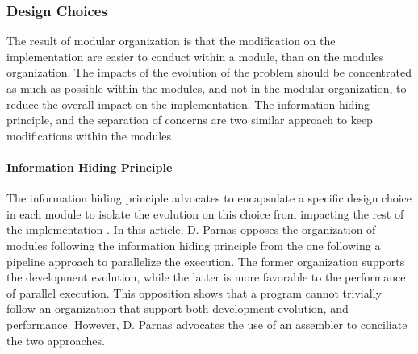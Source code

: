 

\subsubsection{Design Choices}

The result of modular organization is that the modification on the implementation are easier to conduct within a module, than on the modules organization.
The impacts of the evolution of the problem should be concentrated as much as possible within the modules, and not in the modular organization, to reduce the overall impact on the implementation.
The information hiding principle, and the separation of concerns are two similar approach to keep modifications within the modules.

\paragraph{Information Hiding Principle}

The information hiding principle advocates to encapsulate a specific design choice in each module to isolate the evolution on this choice from impacting the rest of the implementation \cite{Parnas1972}.
In this article, D. Parnas opposes the organization of modules following the information hiding principle from the one following a pipeline approach to parallelize the execution.
The former organization supports the development evolution, while the latter is more favorable to the performance of parallel execution.
This opposition shows that a program cannot trivially follow an organization that support both development evolution, and performance.
However, D. Parnas advocates the use of an assembler to conciliate the two approaches.


